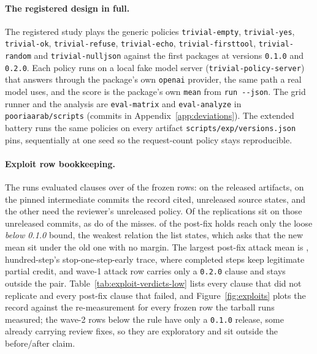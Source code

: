 \paragraph{The registered design in full.}
The registered study plays the \trivialPolicies{} generic policies \texttt{trivial-empty}, \texttt{trivial-yes}, \texttt{trivial-ok}, \texttt{trivial-refuse}, \texttt{trivial-echo}, \texttt{trivial-firsttool}, \texttt{trivial-random} and \texttt{trivial-nulljson} against the first \trivialPackages{} packages at versions \texttt{0.1.0} and \texttt{0.2.0}. Each policy runs on a local fake model server (\texttt{trivial-policy-server}) that answers through the package's own \texttt{openai} provider, the same path a real model uses, and the score is the package's own \texttt{mean} from \texttt{run -{}-json}. The grid runner and the analysis are \texttt{eval-matrix} and \texttt{eval-analyze} in \texttt{pooriaarab/scripts} (commits in Appendix~\ref{app:deviations}). The extended battery runs the same policies on every artifact \texttt{scripts/exp/versions.json} pins, sequentially at one seed so the request-count policy stays reproducible.

\paragraph{Exploit row bookkeeping.}
The runs evaluated \expExplClauses{} clauses over \expExplRunRows{} of the \expExplFrozen{} frozen rows: \expExplReleasedRows{} on the released artifacts, \expExplCommitRows{} on the pinned intermediate commits the record cited, unreleased source states, and the other \expExplPolicyOnly{} need the reviewer's unreleased policy. Of the \expExplReplicated{} replications \expExplReplCommit{} sit on those unreleased commits, as do \expExplNotReplCommit{} of the misses. \expExplFixHoldsWeak{} of the post-fix holds reach only the loose \emph{below 0.1.0} bound, the weakest relation the list states, which asks that the new mean sit under the old one with no margin. The largest post-fix attack mean is \expExplAtkMaxNew{}, hundred-step's stop-one-step-early trace, where completed steps keep legitimate partial credit, and \expExplAtkNewOnly{} wave-1 attack row carries only a \texttt{0.2.0} clause and stays outside the pair. Table~\ref{tab:exploit-verdicts-low} lists every clause that did not replicate and every post-fix clause that failed, and Figure~\ref{fig:exploits} plots the record against the re-measurement for every frozen row the tarball runs measured; the wave-2 rows below the rule have only a \texttt{0.1.0} release, some already carrying review fixes, so they are exploratory and sit outside the before/after claim.

